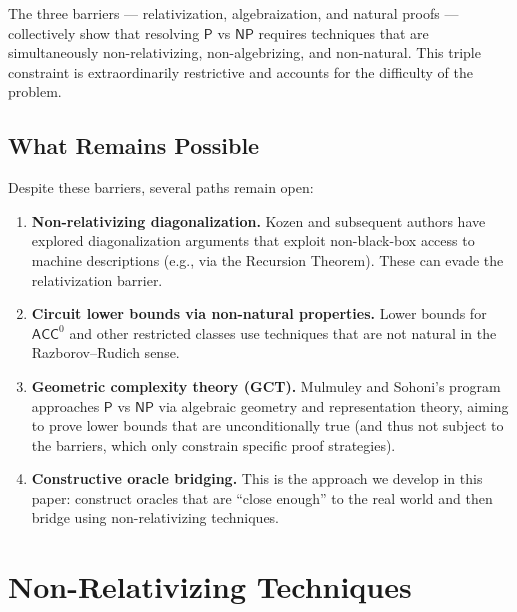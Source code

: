 \documentclass[11pt,a4paper]{article}
\theoremstyle{plain}
\theoremstyle{definition}
\theoremstyle{remark}
\newcommand{\PP}{\mathsf{P}}
\newcommand{\NP}{\mathsf{NP}}
\newcommand{\ACC}{\mathsf{ACC}}
\begin{document}
The three barriers — relativization, algebraization, and natural proofs —
collectively show that resolving $\PP$ vs $\NP$ requires techniques that are
simultaneously non-relativizing, non-algebrizing, and non-natural.  This triple
constraint is extraordinarily restrictive and accounts for the difficulty of the
problem.

\subsection{What Remains Possible}

Despite these barriers, several paths remain open:

\begin{enumerate}[label=(\arabic*)]
    \item \textbf{Non-relativizing diagonalization.}  Kozen \cite{Kozen80} and
    subsequent authors have explored diagonalization arguments that exploit
    non-black-box access to machine descriptions (e.g., via the Recursion
    Theorem).  These can evade the relativization barrier.

    \item \textbf{Circuit lower bounds via non-natural properties.}  Lower
    bounds for $\ACC^0$ \cite{Williams14} and other restricted classes use
    techniques that are not natural in the Razborov--Rudich sense.

    \item \textbf{Geometric complexity theory (GCT).}  Mulmuley and Sohoni's
    program \cite{MS01,MS08} approaches $\PP$ vs $\NP$ via algebraic geometry
    and representation theory, aiming to prove lower bounds that are
    unconditionally true (and thus not subject to the barriers, which only
    constrain specific proof strategies).

    \item \textbf{Constructive oracle bridging.}  This is the approach we
    develop in this paper: construct oracles that are ``close enough'' to the
    real world and then bridge using non-relativizing techniques.
\end{enumerate}

\section{Non-Relativizing Techniques}\label{sec:nonrel}
\end{document}
